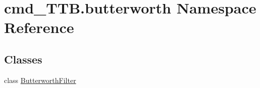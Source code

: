 \hypertarget{namespacecmd__TTB_1_1butterworth}{}\section{cmd\+\_\+\+T\+T\+B.\+butterworth Namespace Reference}
\label{namespacecmd__TTB_1_1butterworth}
\subsection*{Classes}
\begin{DoxyCompactItemize}
\item 
class \hyperlink{classcmd__TTB_1_1butterworth_1_1ButterworthFilter}{Butterworth\+Filter}
\end{DoxyCompactItemize}
